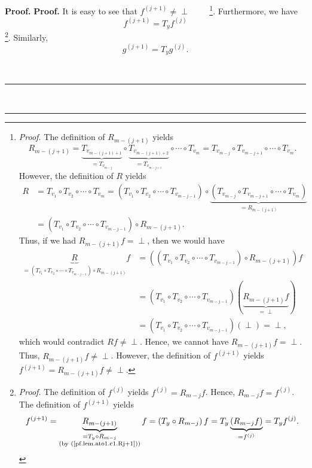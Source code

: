 \documentclass[numbers=enddot,12pt,final,onecolumn,notitlepage]{scrartcl}%
\theoremstyle{definition}
\newenvironment{verlong}{}{}
\newcommand{\undf}{\operatorname*{\bot}}
\newenvironment{proof}[1][Proof]{\noindent\textbf{#1.} }{\ \rule{0.5em}{0.5em}}
\begin{document}
\begin{verlong}
\begin{proof}
\begin{proof}
It is easy to see that $f^{\left(  j+1\right)  }\neq\undf$%
\ \ \ \ \footnote{\textit{Proof.} The definition of $R_{m-\left(  j+1\right)
}$ yields%
\[
R_{m-\left(  j+1\right)  }=\underbrace{T_{v_{m-\left(  j+1\right)  +1}}%
}_{=T_{v_{m-j}}}\circ\underbrace{T_{v_{m-\left(  j+1\right)  +2}}%
}_{=T_{v_{m-j+1}}}\circ\cdots\circ T_{v_{m}}=T_{v_{m-j}}\circ T_{v_{m-j+1}%
}\circ\cdots\circ T_{v_{m}}.
\]
However, the definition of $R$ yields%
\begin{align*}
R  &  =T_{v_{1}}\circ T_{v_{2}}\circ\cdots\circ T_{v_{m}}=\left(  T_{v_{1}%
}\circ T_{v_{2}}\circ\cdots\circ T_{v_{m-j-1}}\right)  \circ
\underbrace{\left(  T_{v_{m-j}}\circ T_{v_{m-j+1}}\circ\cdots\circ T_{v_{m}%
}\right)  }_{=R_{m-\left(  j+1\right)  }}\\
&  =\left(  T_{v_{1}}\circ T_{v_{2}}\circ\cdots\circ T_{v_{m-j-1}}\right)
\circ R_{m-\left(  j+1\right)  }.
\end{align*}
Thus, if we had $R_{m-\left(  j+1\right)  }f=\undf$, then we would have%
\begin{align*}
\underbrace{R}_{=\left(  T_{v_{1}}\circ T_{v_{2}}\circ\cdots\circ
T_{v_{m-j-1}}\right)  \circ R_{m-\left(  j+1\right)  }}f  &  =\left(  \left(
T_{v_{1}}\circ T_{v_{2}}\circ\cdots\circ T_{v_{m-j-1}}\right)  \circ
R_{m-\left(  j+1\right)  }\right)  f\\
&  =\left(  T_{v_{1}}\circ T_{v_{2}}\circ\cdots\circ T_{v_{m-j-1}}\right)
\left(  \underbrace{R_{m-\left(  j+1\right)  }f}_{=\undf}\right) \\
&  =\left(  T_{v_{1}}\circ T_{v_{2}}\circ\cdots\circ T_{v_{m-j-1}}\right)
\left(  \undf\right)  =\undf,
\end{align*}
which would contradict $Rf\neq\undf$. Hence, we cannot have $R_{m-\left(
j+1\right)  }f=\undf$. Thus, $R_{m-\left(  j+1\right)  }f\neq\undf$. However,
the definition of $f^{\left(  j+1\right)  }$ yields $f^{\left(  j+1\right)
}=R_{m-\left(  j+1\right)  }f\neq\undf$.}. Furthermore, we have
\[
f^{\left(  j+1\right)  }=T_{y}f^{\left(  j\right)  }%
\]
\footnote{\textit{Proof.} The definition of $f^{\left(  j\right)  }$ yields
$f^{\left(  j\right)  }=R_{m-j}f$. Hence, $R_{m-j}f=f^{\left(  j\right)  }$.
The definition of $f^{\left(  j+1\right)  }$ yields%
\[
f^{\left(  j+1\right)  }=\underbrace{R_{m-\left(  j+1\right)  }}%
_{\substack{=T_{y}\circ R_{m-j}\\\text{(by (\ref{pf.lem.ato1.c1.Rj+1}))}%
}}f=\left(  T_{y}\circ R_{m-j}\right)  f=T_{y}\underbrace{\left(
R_{m-j}f\right)  }_{=f^{\left(  j\right)  }}=T_{y}f^{\left(  j\right)  }.
\]
}. Similarly,%
\[
g^{\left(  j+1\right)  }=T_{y}g^{\left(  j\right)  }.
\]



\end{proof}
\end{proof}
\end{verlong}
\end{document}

